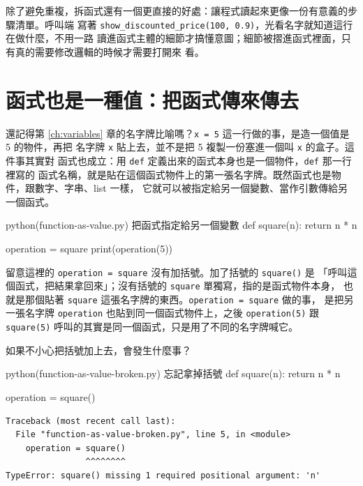 除了避免重複，拆函式還有一個更直接的好處：讓程式讀起來更像一份有意義的步驟清單。呼叫端
寫著 \texttt{show\_discounted\_price(100, 0.9)}，光看名字就知道這行在做什麼，不用一路
讀進函式主體的細節才搞懂意圖；細節被摺進函式裡面，只有真的需要修改邏輯的時候才需要打開來
看。


\section{函式也是一種值：把函式傳來傳去}
\label{sec:function-first-class}

還記得第 \ref{ch:variables} 章的名字牌比喻嗎？\texttt{x = 5} 這一行做的事，是造一個值是 5 的物件，再把
名字牌 \texttt{x} 貼上去，並不是把 5 複製一份塞進一個叫 \texttt{x} 的盒子。這件事其實對
函式也成立：用 \texttt{def} 定義出來的函式本身也是一個物件，\texttt{def} 那一行裡寫的
函式名稱，就是貼在這個函式物件上的第一張名字牌。既然函式也是物件，跟數字、字串、list 一樣，
它就可以被指定給另一個變數、當作引數傳給另一個函式。

\begin{example}{python}{(function-as-value.py) 把函式指定給另一個變數}
def square(n):
    return n * n


operation = square
print(operation(5))
\end{example}


留意這裡的 \texttt{operation = square} 沒有加括號。加了括號的 \texttt{square()} 是
「呼叫這個函式，把結果拿回來」；沒有括號的 \texttt{square} 單獨寫，指的是函式物件本身，
也就是那個貼著 \texttt{square} 這張名字牌的東西。\texttt{operation = square} 做的事，
是把另一張名字牌 \texttt{operation} 也貼到同一個函式物件上，之後 \texttt{operation(5)}
跟 \texttt{square(5)} 呼叫的其實是同一個函式，只是用了不同的名字牌喊它。

如果不小心把括號加上去，會發生什麼事？

\begin{example}{python}{(function-as-value-broken.py) 忘記拿掉括號}
def square(n):
    return n * n


operation = square()
\end{example}

\begin{verbatim}
Traceback (most recent call last):
  File "function-as-value-broken.py", line 5, in <module>
    operation = square()
                ^^^^^^^^
TypeError: square() missing 1 required positional argument: 'n'
\end{verbatim}

